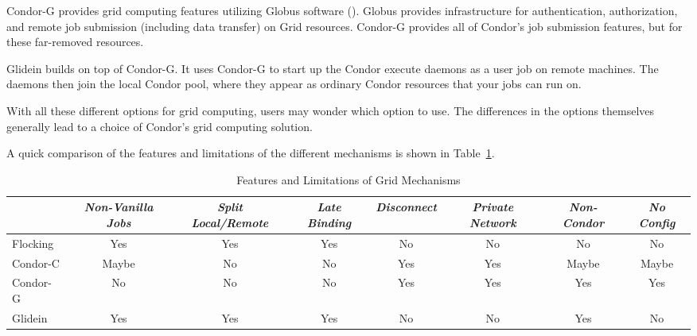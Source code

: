 Condor-G provides
grid computing features utilizing Globus software
().
Globus provides infrastructure for authentication, authorization,
and remote job submission (including data transfer) on Grid resources.
Condor-G provides all of Condor's job submission features,
but for these far-removed resources.

Glidein builds on top of Condor-G.
It uses Condor-G to start up the Condor
execute daemons as a user job on remote machines.
The daemons then join
the local Condor pool, where they appear as ordinary
Condor resources that your jobs can run on.


With all these different options for grid computing, 
users may 
wonder which option to use.
The differences in the options themselves generally lead
to a choice of Condor's grid computing solution.


A quick comparison of the features and limitations of the different
mechanisms is shown in Table~\ref{grid-features}.

\begin{center}
\begin{table}[hbt]
\begin{tabular}{|l||c|c|c|c|c|c|c|} \hline
 & \emph{Non-Vanilla Jobs} & \emph{Split Local/Remote} &
\emph{Late Binding} & \emph{Disconnect} & \emph{Private Network} &
\emph{Non-Condor} & \emph{No Config} \\ \hline \hline
Flocking & Yes & Yes & Yes & No & No & No & No \\ \hline
Condor-C & Maybe & No & No & Yes & Yes & Maybe & Maybe \\ \hline
Condor-G & No & No & No & Yes & Yes & Yes & Yes \\ \hline
Glidein & Yes & Yes & Yes & No & No & Yes & No \\ \hline
\end{tabular}
\caption{\label{grid-features}Features and Limitations of Grid Mechanisms}
\end{table}
\end{center}

